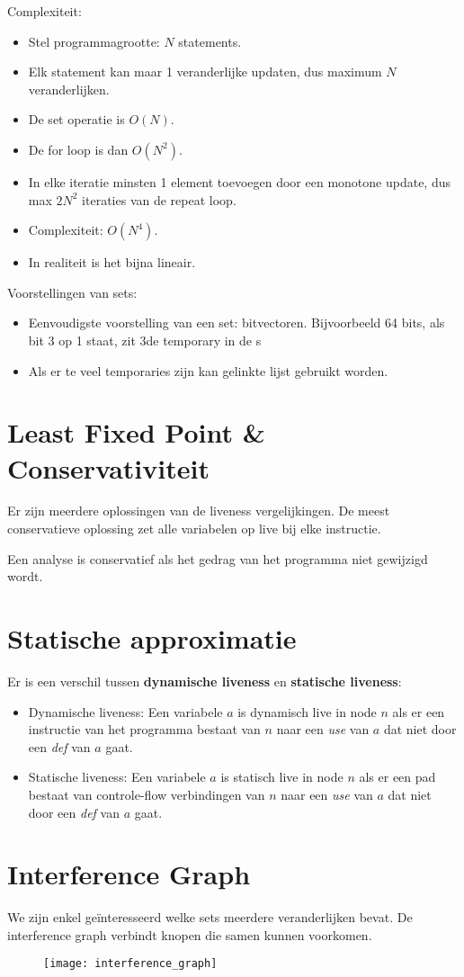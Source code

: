 Complexiteit:
\begin{itemize}
	\item Stel programmagrootte: $N$ statements.
	\item Elk statement kan maar 1 veranderlijke updaten, dus maximum $N$ veranderlijken.
	\item De set operatie is $O(N)$.
	\item De for loop is dan $O(N^2)$.
	\item In elke iteratie minsten 1 element toevoegen door een monotone update, dus max $2N^2$ iteraties van de repeat loop.
	\item Complexiteit: $O(N^4)$.
	\item In realiteit is het bijna lineair.
\end{itemize}

Voorstellingen van sets:
\begin{itemize}
	\item Eenvoudigste voorstelling van een set: bitvectoren. Bijvoorbeeld 64 bits, als bit 3 op 1 staat, zit 3de temporary in de s
	\item Als er te veel temporaries zijn kan gelinkte lijst gebruikt worden.
\end{itemize}


\section{Least Fixed Point \& Conservativiteit}
Er zijn meerdere oplossingen van de liveness vergelijkingen. De meest conservatieve oplossing zet alle variabelen op live bij elke instructie. 


Een analyse is conservatief als het gedrag van het programma niet gewijzigd wordt.


\section{Statische approximatie}
Er is een verschil tussen \textbf{dynamische liveness} en \textbf{statische liveness}:
\begin{itemize}
	\item Dynamische liveness: Een variabele $a$ is dynamisch live in node $n$ als er een instructie van het programma bestaat van $n$ naar een \textit{use} van $a$ dat niet door een \textit{def} van $a$ gaat.
	\item Statische liveness: Een variabele $a$ is statisch live in node $n$ als er een pad bestaat van controle-flow verbindingen van $n$ naar een \textit{use} van $a$ dat niet door een \textit{def} van $a$ gaat.
\end{itemize}


\section{Interference Graph}
We zijn enkel geïnteresseerd welke sets meerdere veranderlijken bevat. De interference graph verbindt knopen die samen kunnen voorkomen.
\begin{figure}[ht]
	\centering
	\texttt{[image: interference\_graph]}
\end{figure}